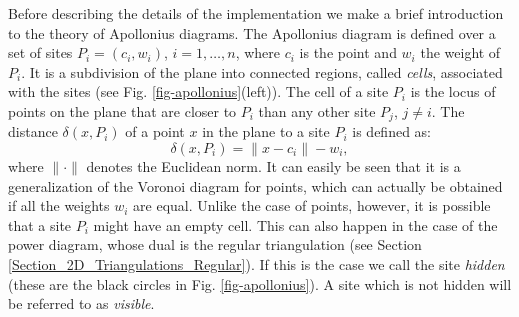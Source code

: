Before describing the details of the implementation we make a brief
introduction to the theory of Apollonius diagrams.
The Apollonius diagram is defined over a set of sites
$P_i=(c_i,w_i)$, $i=1,\ldots,n$, where $c_i$ is the point and $w_i$
the weight of $P_i$. It is a subdivision of the plane into connected
regions, called {\em cells}, associated with the sites (see
Fig. \ref{fig-apollonius}(left)). The cell of a 
site $P_i$ is the locus of points on the plane that are
closer to $P_i$ than any other site $P_j$, $j\neq i$.
The distance $\delta(x, P_i)$ of a point $x$ in the plane to a
site $P_i$ is defined as: 
\[      \delta(x,P_i)=\|x-c_i\|-w_i,\]
where $\|\cdot\|$ denotes the Euclidean norm.
It can easily be seen that it is a generalization of the Voronoi
diagram for points, which can actually be obtained if all the weights
$w_i$ are equal. Unlike the case of points, however, it is
possible that a site $P_i$ might have an empty cell. This
can also happen in the case of the power diagram, whose dual is the
regular triangulation (see Section
\ref{Section_2D_Triangulations_Regular}). If this is
the case we call the site {\em hidden} (these are the black
circles in Fig. \ref{fig-apollonius}). A site which is not
hidden will be referred to as {\em visible}.

